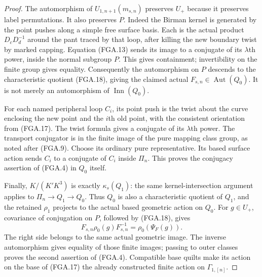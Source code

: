 \begin{proof}
The automorphism of $U_{1,n+1}(m_{s,n})$ preserves
$U_+$ because it preserves label permutations.
It also preserves $P$.  Indeed the Birman kernel
is generated by the point pushes along a simple
free surface basis.  Each is the actual product
$D_cD_d^{-1}$ around the pant traced by that loop,
after killing the new boundary twist by marked
capping.  Equation (FGA.13) sends its image to a
conjugate of its $\lambda$th power, inside the
normal subgroup $P$.  This gives containment;
invertibility on the finite group gives equality.
Consequently the automorphism on $P$ descends to
the characteristic quotient (FGA.18), giving the
claimed actual $F_{s,n}\in\operatorname{Aut}(Q_0)$.
It is not merely an automorphism of
$\operatorname{Inn}(Q_0)$.

For each named peripheral loop $C_i$, its point
push is the twist about the curve enclosing the
new point and the $i$th old point, with the
consistent orientation from (FGA.17).
The twist formula gives a conjugate of its
$\lambda$th power.  The transport conjugator is
in the finite image of the pure mapping class
group, as noted after (FGA.9).  Choose its ordinary
pure representative.  Its based surface action
sends $C_i$ to a conjugate of $C_i$ inside
$\Pi_n$.  This proves the conjugacy assertion
of (FGA.4) in $Q_0$ itself.

Finally, $K/(K'K^3)$ is exactly $\kappa_s(Q_1)$:
the same kernel-intersection argument applies to
$\Pi_n\to Q_1\to Q_0$.  Thus $Q_0$ is also a
characteristic quotient of $Q_1$, and the retained
$\rho_1$ projects to the actual based geometric
action on $Q_0$.  For $g\in U_+$, covariance of
conjugation on $P$, followed by (FGA.18), gives
\[
 F_{s,n}\rho_0(g)F_{s,n}^{-1}
                       =\rho_0(\Psi_F(g)).
                                                               \tag{FGA.19}
\]
The right side belongs to the same actual geometric
image.  The inverse automorphism gives equality
of those finite images; passing to outer classes
proves the second assertion of (FGA.4).
Compatible base quilts make its action on the
base of (FGA.17) the already constructed
finite action on $\Gamma_{1,[n]}$.


\end{proof}
